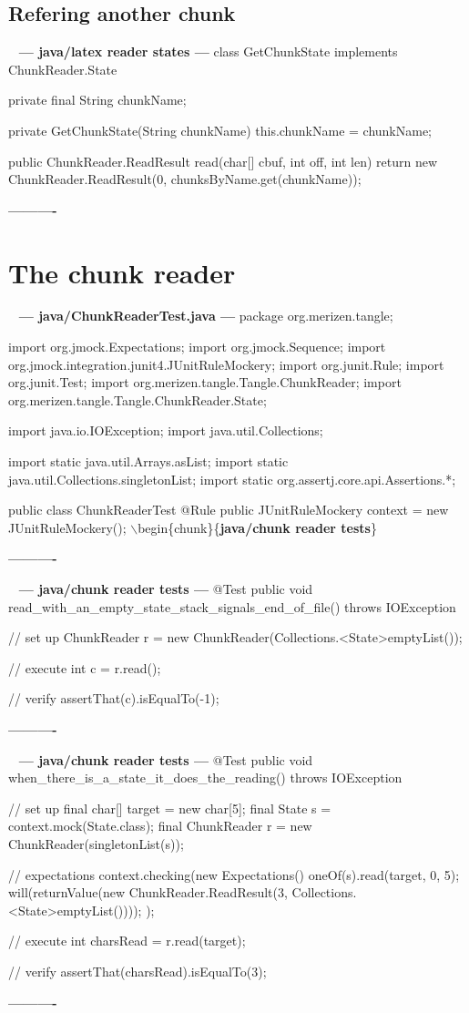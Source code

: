 \documentclass{book}
\newenvironment{chunk}[1]{%
{\ }\newline\noindent%
\hbox{\hskip 2.0cm}{\bf --- #1 ---}%
\verbatim}%                               say exactly what we see
{\endverbatim%
\par{}%
\noindent{}%
\hbox{\hskip 2.0cm}{\bf ----------}%
\par%
\normalsize\noindent}%
\providecommand{\getchunk}[1]{%
\noindent%
{\small $\backslash{}$begin\{chunk\}\{{\bf #1}\}}%
\index{{#1}}}
\begin{document}
\subsection{Refering another chunk}
\begin{chunk}{java/latex reader states}
class GetChunkState implements ChunkReader.State {
    private final String chunkName;

    private GetChunkState(String chunkName) {
        this.chunkName = chunkName;
    }

    public ChunkReader.ReadResult read(char[] cbuf, int off, int len) {
        return new ChunkReader.ReadResult(0, chunksByName.get(chunkName));
    }
}
\end{chunk}

\section{The chunk reader}
\begin{chunk}{java/ChunkReaderTest.java}
package org.merizen.tangle;

import org.jmock.Expectations;
import org.jmock.Sequence;
import org.jmock.integration.junit4.JUnitRuleMockery;
import org.junit.Rule;
import org.junit.Test;
import org.merizen.tangle.Tangle.ChunkReader;
import org.merizen.tangle.Tangle.ChunkReader.State;

import java.io.IOException;
import java.util.Collections;

import static java.util.Arrays.asList;
import static java.util.Collections.singletonList;
import static org.assertj.core.api.Assertions.*;

public class ChunkReaderTest {
    @Rule
    public JUnitRuleMockery context = new JUnitRuleMockery();
\getchunk{java/chunk reader tests}
}
\end{chunk}

\begin{chunk}{java/chunk reader tests}
@Test
public void read_with_an_empty_state_stack_signals_end_of_file() throws IOException {
    // set up
    ChunkReader r = new ChunkReader(Collections.<State>emptyList());

    // execute
    int c = r.read();

    // verify
    assertThat(c).isEqualTo(-1);
}
\end{chunk}

\begin{chunk}{java/chunk reader tests}
@Test
public void when_there_is_a_state_it_does_the_reading() throws IOException {
    // set up
    final char[] target = new char[5];
    final State s = context.mock(State.class);
    final ChunkReader r = new ChunkReader(singletonList(s));

    // expectations
    context.checking(new Expectations() {{
        oneOf(s).read(target, 0, 5);
        will(returnValue(new ChunkReader.ReadResult(3, Collections.<State>emptyList())));
    }});

    // execute
    int charsRead = r.read(target);

    // verify
    assertThat(charsRead).isEqualTo(3);
}
\end{chunk}
\end{document}
